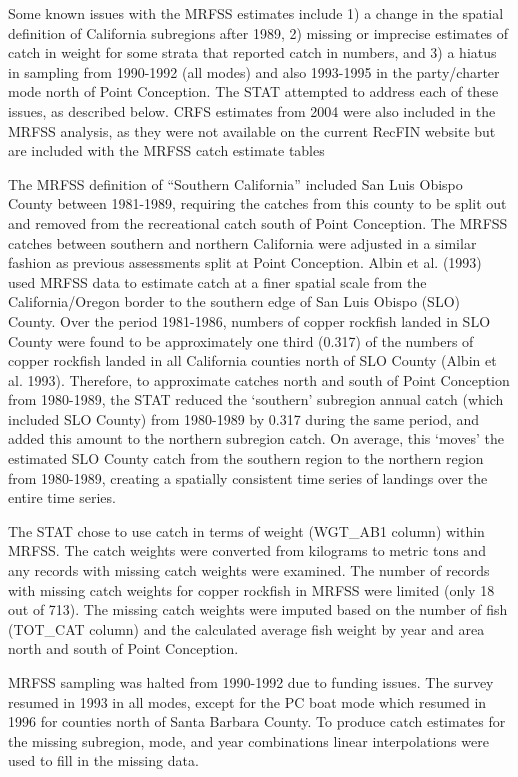 \documentclass[11pt,
  english,
  letterpaper,
]{article}
\begin{document}
Some known issues with the MRFSS estimates include 1) a change in the spatial definition of California subregions after 1989, 2) missing or imprecise estimates of catch in weight for some strata that reported catch in numbers, and 3) a hiatus in sampling from 1990-1992 (all modes) and also 1993-1995 in the party/charter mode north of Point Conception. The STAT attempted to address each of these issues, as described below. CRFS estimates from 2004 were also included in the MRFSS analysis, as they were not available on the current RecFIN website but are included with the MRFSS catch estimate tables

The MRFSS definition of ``Southern California'' included San Luis Obispo County between 1981-1989, requiring the catches from this county to be split out and removed from the recreational catch south of Point Conception. The MRFSS catches between southern and northern California were adjusted in a similar fashion as previous assessments split at Point Conception. Albin et al. (1993) used MRFSS data to estimate catch at a finer spatial scale from the California/Oregon border to the southern edge of San Luis Obispo (SLO) County. Over the period 1981-1986, numbers of copper rockfish landed in SLO County were found to be approximately one third (0.317) of the numbers of copper rockfish landed in all California counties north of SLO County (Albin et al. 1993). Therefore, to approximate catches north and south of Point Conception from 1980-1989, the STAT reduced the `southern' subregion annual catch (which included SLO County) from 1980-1989 by 0.317 during the same period, and added this amount to the northern subregion catch. On average, this `moves' the estimated SLO County catch from the southern region to the northern region from 1980-1989, creating a spatially consistent time series of landings over the entire time series.

The STAT chose to use catch in terms of weight (WGT\_AB1 column) within MRFSS. The catch weights were converted from kilograms to metric tons and any records with missing catch weights were examined. The number of records with missing catch weights for copper rockfish in MRFSS were limited (only 18 out of 713). The missing catch weights were imputed based on the number of fish (TOT\_CAT column) and the calculated average fish weight by year and area north and south of Point Conception.

MRFSS sampling was halted from 1990-1992 due to funding issues. The survey resumed in 1993 in all modes, except for the PC boat mode which resumed in 1996 for counties north of Santa Barbara County. To produce catch estimates for the missing subregion, mode, and year combinations linear interpolations were used to fill in the missing data.
\end{document}
